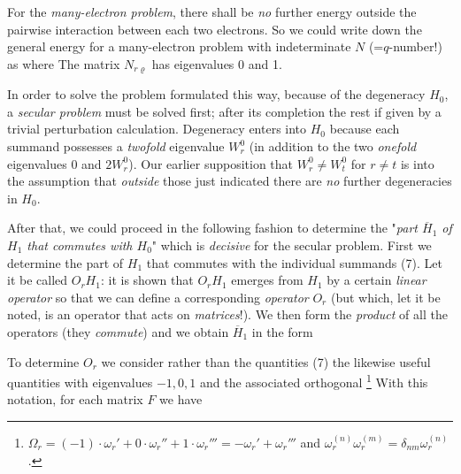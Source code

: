 \begin{paper}{1}
For the \textit{many-electron problem}, there shall be \textit{no} further energy outside the pairwise interaction between each two electrons. So we could write down the general energy for a many-electron problem with indeterminate $N$ (=$q$-number!) as
where
The matrix $N_{r\varrho}$ has eigenvalues 0 and 1. 

In order to solve the problem formulated this way, because of the degeneracy $H_0$, a \textit{secular problem} must be solved first; after its completion the rest if given by a trivial perturbation calculation. Degeneracy enters into $H_0$ because each summand
possesses a \textit{twofold} eigenvalue $W_r^0$ (in addition to the two \textit{onefold} eigenvalues 0 and $2W_r^0$). Our earlier supposition that $W_r^0 \neq W_t^0$ for $r\neq t$ is  into the assumption that \textit{outside} those just indicated there are \textit{no} further degeneracies in $H_0$.

After that, we could proceed in the following fashion to determine the "\textit{part $\overline{H}_1$ of $H_1$ that commutes with $H_0$}" which is \textit{decisive} for the secular problem. First we determine the part of $H_1$ that commutes with the individual summands (7). Let it be called $O_r H_1$: it is shown that $O_r H_1$ emerges from $H_1$ by a certain \textit{linear operator} so that we can define a corresponding \textit{operator} $O_r$ (but which, let it be noted, is an operator that acts on \textit{matrices}!). We then form the \textit{product} of all the operators (they \textit{commute})
and we obtain $\overline{H}_1$ in the form

To determine $O_r$ we consider rather than the quantities (7) the likewise useful quantities
with eigenvalues $-1,0,1$ and the associated orthogonal \footnote{$\Omega_r=(-1)\cdot\omega_r' + 0\cdot\omega_r'' + 1\cdot\omega_r''' = -\omega_r'+ \omega_r'''$ and $\omega_r^{(n)}\omega_r^{(m)}=\delta_{nm}\omega_r^{(n)}$.} 
With this notation, for each matrix $F$ we have


\end{paper}
